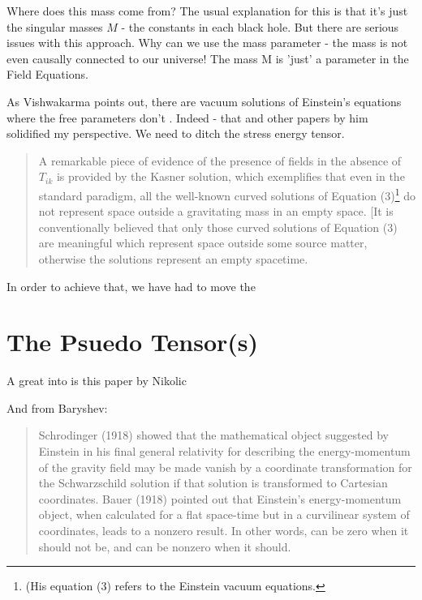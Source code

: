 \documentclass[../rzero]{subfiles}
\begin{document}
Where does this mass come from? The usual explanation for this is that it's just the singular masses $M$ - the constants in each black hole. But there are serious issues with this approach. Why can we use the mass parameter - the mass is not even causally connected to our universe! The mass M is 'just' a parameter in the Field Equations. 

As Vishwakarma\cite{vishwakarmaEinsteinCriticalPerspective2016} points out, there are vacuum solutions of Einstein's equations where the free parameters don't . Indeed - that and other papers by him solidified my perspective. We need to ditch the stress energy tensor.

\begin{quotation}
	A remarkable piece of evidence of the presence of fields in the absence of $T_{ik}$ is provided by the Kasner solution, which exemplifies that even in the standard paradigm, all the well-known curved solutions of Equation (3)\footnote{(His equation (3) refers to the Einstein vacuum equations.} do not represent space outside a gravitating mass in an empty space. [It is conventionally believed that only those curved solutions of Equation (3) are meaningful which represent space outside some source matter, otherwise the solutions represent an empty spacetime.
\end{quotation}


In order to achieve that, we have had to move the  


\section{The Psuedo Tensor(s)}

A great into is this paper by Nikolic\cite{nikolicTrivialSolutionGravitational2014}



And from Baryshev\cite{08092323EnergyMomentumGravitational}:
\begin{quotation}
	Schrodinger (1918) showed that the mathematical object suggested by Einstein in his final general relativity for describing the energy-momentum of the gravity field may be made vanish by a coordinate transformation for the Schwarzschild solution if that solution is transformed to Cartesian coordinates. Bauer (1918) pointed out that Einstein's energy-momentum object, when calculated for a flat space-time but in a  curvilinear system of coordinates, leads to a nonzero result. In other words, can be zero when it should not be, and can be nonzero when it should.
\end{quotation}
\end{document}
